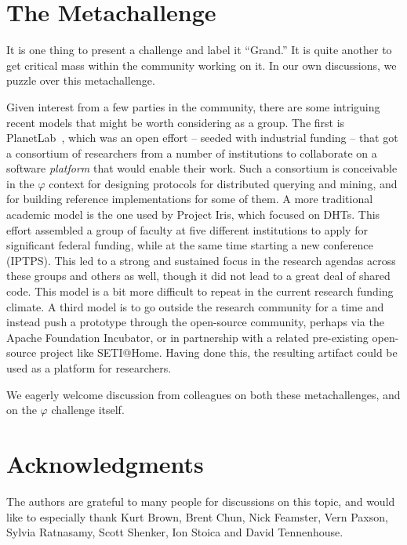 \documentclass{acm_proc_article-sp}
\def\philogo{{\large $\varphi$}\xspace}
\begin{document}
\section{The Metachallenge} It is one thing to present a challenge and label it ``Grand.'' It is quite another to get critical mass within the community working on it. In our own discussions, we puzzle over this metachallenge.

Given interest from a few parties in the community, there are some intriguing recent models that might be worth considering as a group. The first is PlanetLab~\cite{Peterson2002}, which was an open effort -- seeded with industrial funding -- that got a consortium of researchers from a number of institutions to collaborate on a software {\em platform} that would enable their work. Such a consortium is conceivable in the \philogo context for designing protocols for distributed querying and mining, and for building reference implementations for some of them. A more traditional academic model is the one used by Project Iris, which focused on DHTs. This effort assembled a group of faculty at five different institutions to apply for significant federal funding, while at the same time starting a new conference (IPTPS). This led to a strong and sustained focus in the research agendas across these groups and others as well, though it did not lead to a great deal of shared code. This model is a bit more difficult to repeat in the current research funding climate. A third model is to go outside the research community for a time and instead push a prototype through the open-source community, perhaps via the Apache Foundation Incubator, or in partnership with a related pre-existing open-source project like SETI@Home. Having done this, the resulting artifact could be used as a platform for researchers.

We eagerly welcome discussion from colleagues on both these
meta\-challenges, and on the \philogo challenge itself. 

\section{Acknowledgments} The authors are grateful to many people for discussions on this topic, and would like to especially thank Kurt Brown, Brent Chun, Nick Feamster, Vern Paxson, Sylvia Ratnasamy, Scott Shenker, Ion Stoica and David Tennenhouse.

{

 
 } 
\end{document}

